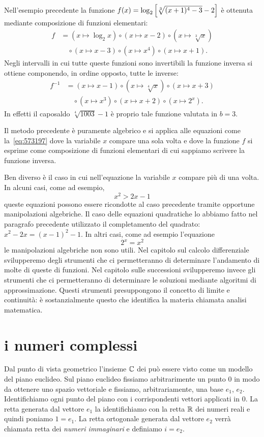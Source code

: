 Nell'esempio precedente la funzione 
$f(x) = \log_2{\left[ \sqrt[3]{(x+1)^4-3}-2 \right]}$
è ottenuta mediante composizione di funzioni elementari:
\begin{align*}
f &= (x\mapsto \log_2 x)\circ(x\mapsto x-2)\circ (x \mapsto \sqrt[3]{x})\\
  &\quad \circ (x \mapsto x-3) \circ (x\mapsto x^4) \circ (x\mapsto x+1).
\end{align*}
Negli intervalli in cui tutte queste funzioni sono invertibili 
la funzione inversa si ottiene componendo, in ordine opposto,
tutte le inverse:
\begin{align*}
  f^{-1} &= (x\mapsto x-1) \circ (x\mapsto \sqrt[4]{x}) \circ (x \mapsto x+3) \\
    &\quad \circ (x \mapsto x^3) \circ (x \mapsto x+2) \circ (x\mapsto 2^x).
\end{align*}
In effetti il caposaldo $\sqrt[4]{1003}-1$ è proprio tale 
funzione valutata in $b=3$.

Il metodo precedente è puramente algebrico e 
si applica alle equazioni 
come la~\eqref{eq:573197} dove la variabile $x$ 
compare una sola volta e dove la funzione $f$ si esprime 
come composizione di funzioni elementari di cui sappiamo 
scrivere la funzione inversa. 

Ben diverso è il caso in cui nell'equazione la variabile $x$ 
compare più di una volta.
In alcuni casi, come ad esempio,
\[
  x^2 > 2x - 1  
\]
queste equazioni 
possono essere ricondotte al caso precedente tramite 
opportune manipolazioni algebriche.
Il caso delle equazioni quadratiche lo abbiamo 
fatto nel paragrafo precedente utilizzato il completamento 
del quadrato: $x^2-2x = (x-1)^2-1$. 
In altri casi, come ad esempio l'equazione
\[
  2^x = x^2
\]  
le manipolazioni algebriche non sono utili.
Nel capitolo sul calcolo differenziale svilupperemo degli strumenti 
che ci permetteranno di determinare l'andamento di molte di queste 
di funzioni. 
Nel capitolo sulle successioni svilupperemo invece gli strumenti 
che ci permetteranno di determinare le soluzioni mediante 
algoritmi di approssimazione.
Questi strumenti presuppongono il concetto 
di limite e continuità: è sostanzialmente questo che identifica 
la materia chiamata analisi matematica.


\section{i numeri complessi}

Dal punto di vista geometrico l'insieme $\CC$ dei 
\index{$\CC$}
può essere visto come un modello del piano euclideo.
Sul piano euclideo fissiamo arbitrarimente un punto $0$ in modo da ottenere uno spazio
vettoriale e fissiamo, arbitrariamente, una base $e_1$, $e_2$.
Identifichiamo ogni punto del piano con i corrispondenti vettori
applicati in $0$. La retta generata dal vettore $e_1$ la identifichiamo
con la retta $\mathbb R$ dei numeri reali e quindi poniamo $1=e_1$.
La retta ortogonale generata dal vettore $e_2$ verrà chiamata
retta dei \emph{numeri immaginari} e definiamo $i=e_2$.

